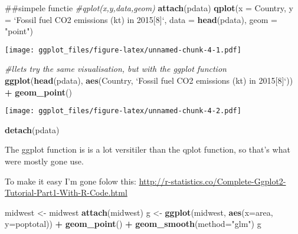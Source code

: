 \documentclass[]{article}
\newenvironment{Shaded}{\begin{snugshade}}{\end{snugshade}}
\newcommand{\KeywordTok}[1]{\textcolor[rgb]{0.13,0.29,0.53}{\textbf{#1}}}
\newcommand{\DataTypeTok}[1]{\textcolor[rgb]{0.13,0.29,0.53}{#1}}
\newcommand{\StringTok}[1]{\textcolor[rgb]{0.31,0.60,0.02}{#1}}
\newcommand{\CommentTok}[1]{\textcolor[rgb]{0.56,0.35,0.01}{\textit{#1}}}
\newcommand{\OperatorTok}[1]{\textcolor[rgb]{0.81,0.36,0.00}{\textbf{#1}}}
\newcommand{\NormalTok}[1]{#1}
\begin{document}
\begin{Shaded}
\begin{Highlighting}[]
\NormalTok{##simpele functie}
\CommentTok{#qplot(x,y,data,geom)}
\KeywordTok{attach}\NormalTok{(pdata)}
\KeywordTok{qplot}\NormalTok{(}\DataTypeTok{x =}\NormalTok{ Country, }\DataTypeTok{y =} \StringTok{`}\DataTypeTok{Fossil fuel CO2 emissions (kt) in 2015[8]}\StringTok{`}\NormalTok{, }\DataTypeTok{data =} \KeywordTok{head}\NormalTok{(pdata), }\DataTypeTok{geom =} \StringTok{"point"}\NormalTok{)}
\end{Highlighting}
\end{Shaded}

\texttt{[image: ggplot\_files/figure-latex/unnamed-chunk-4-1.pdf]}

\begin{Shaded}
\begin{Highlighting}[]
\CommentTok{#llets try the same visualisation, but with the ggplot function}
\KeywordTok{ggplot}\NormalTok{(}\KeywordTok{head}\NormalTok{(pdata), }\KeywordTok{aes}\NormalTok{(Country, }\StringTok{`}\DataTypeTok{Fossil fuel CO2 emissions (kt) in 2015[8]}\StringTok{`}\NormalTok{)) }\OperatorTok{+}\StringTok{ }\KeywordTok{geom_point}\NormalTok{()}
\end{Highlighting}
\end{Shaded}

\texttt{[image: ggplot\_files/figure-latex/unnamed-chunk-4-2.pdf]}

\begin{Shaded}
\begin{Highlighting}[]
\KeywordTok{detach}\NormalTok{(pdata)}
\end{Highlighting}
\end{Shaded}

The ggplot function is is a lot versitiler than the qplot function, so
that's what were mostly gone use.

To make it easy I'm gone folow this:
\url{http://r-statistics.co/Complete-Ggplot2-Tutorial-Part1-With-R-Code.html}

\begin{Shaded}
\begin{Highlighting}[]
\NormalTok{midwest <-}\StringTok{ }\NormalTok{midwest}
\KeywordTok{attach}\NormalTok{(midwest)}
\NormalTok{g <-}\StringTok{ }\KeywordTok{ggplot}\NormalTok{(midwest, }\KeywordTok{aes}\NormalTok{(}\DataTypeTok{x=}\NormalTok{area, }\DataTypeTok{y=}\NormalTok{poptotal)) }\OperatorTok{+}\StringTok{ }\KeywordTok{geom_point}\NormalTok{() }\OperatorTok{+}\StringTok{ }\KeywordTok{geom_smooth}\NormalTok{(}\DataTypeTok{method=}\StringTok{"glm"}\NormalTok{) }
\NormalTok{g}
\end{Highlighting}
\end{Shaded}
\end{document}
